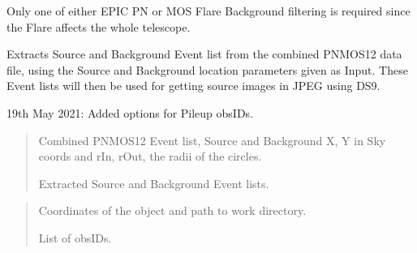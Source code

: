 \documentclass[letterpaper,10pt,english]{sphinxmanual}
\begin{document}
\begin{fulllineitems}
\begin{fulllineitems}
\sphinxAtStartPar
Only one of either EPIC PN or MOS Flare Background filtering is required
since the Flare affects the whole telescope.

\end{fulllineitems}


\begin{fulllineitems}
\label{\detokenize{xmmPipeline:xmmPipeline.epicObj.epicObj.extract_srcBkg_eventLists}}
\pysigstartsignatures
{}
\pysigstopsignatures
\sphinxAtStartPar
Extracts Source and Background Event list from the combined PNMOS12 data file,
using the Source and Background location parameters given as Input.
These Event lists will then be used for getting source images in JPEG using DS9.

\sphinxAtStartPar
19th May 2021: Added options for Pile\sphinxhyphen{}up obsIDs.
\begin{quote}\begin{description}
\sphinxAtStartPar
Combined PNMOS12 Event list, Source and Background X, Y in Sky coords and
rIn, rOut, the radii of the circles.

\sphinxAtStartPar
Extracted Source and Background Event lists.

\end{description}\end{quote}

\end{fulllineitems}


\begin{fulllineitems}
\label{\detokenize{xmmPipeline:xmmPipeline.epicObj.epicObj.findObsIDs}}
\pysigstartsignatures
{}
\pysigstopsignatures\begin{quote}\begin{description}
\sphinxAtStartPar
Coordinates of the object and path to work directory.

\sphinxAtStartPar
List of obsIDs.


\end{description}
\end{quote}
\end{fulllineitems}
\end{fulllineitems}
\end{document}
